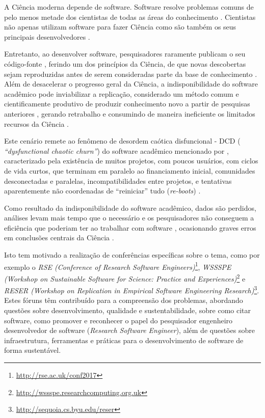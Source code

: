 \label{introducao}

A Ciência moderna depende de software. Software resolve problemas comuns de
pelo menos metade dos cientistas de todas as áreas do conhecimento
\cite{wilson2014best}. Cientistas não apenas utilizam software para fazer
Ciência como são também os seus principais desenvolvedores
\cite{goble2014better}.

Entretanto, ao desenvolver software, pesquisadores raramente publicam o seu
código-fonte \cite{robles2010replicating, amann2015software}, ferindo um dos
princípios da Ciência, de que novas descobertas sejam reproduzidas antes de
serem consideradas parte da base de conhecimento \cite{stodden2009enabling}.
%
Além de desacelerar o progresso geral da Ciência, a indisponibilidade do
software acadêmico pode inviabilizar a replicação, considerado um  método comum
e cientificamente produtivo de produzir conhecimento novo a partir de pesquisas
anteriores \cite{king1995replication, stodden2010reproducible}, gerando
retrabalho e consumindo de maneira ineficiente os limitados recursos da Ciência
\cite{howison2013incentives, katz2014transitive}.

Este cenário remete ao fenômeno de desordem caótica disfuncional - DCD ({\it
``dysfunctional chaotic churn''}) do software acadêmico mencionado por
, caracterizado pela existência de muitos
projetos, com poucos usuários, com ciclos de vida curtos, que terminam em
paralelo ao financiamento inicial, comunidades desconectadas e paralelas,
incompatibilidades entre projetos, e tentativas aparentemente não coordenadas
de ``reiniciar'' tudo ({\it re-boots}) \cite{howison2015understanding}.

Como resultado da indisponibilidade do software acadêmico, dados são perdidos,
análises levam mais tempo que o necessário e os pesquisadores não conseguem a
eficiência que poderiam ter ao trabalhar com software \cite{wilson2017good},
ocasionando graves erros em conclusões centrais da Ciência
\cite{merali2010computational}.

Isto tem motivado a realização de conferências específicas sobre o tema, como
por exemplo o {\it RSE (Conference of Research Software
Engineers)}\footnote{\url{http://rse.ac.uk/conf2017}}, {\it WSSSPE (Workshop on
Sustainable Software for Science: Practice and
Experiences)}\footnote{\url{http://wssspe.researchcomputing.org.uk}} e {\it
RESER (Workshop on Replication in Empirical Software Engineering
Research)}\footnote{\url{http://sequoia.cs.byu.edu/reser}}.  Estes fóruns têm
contribuído para a compreensão dos problemas, abordando questões sobre
desenvolvimento, qualidade e sustentabilidade, sobre como citar software, como
promover e reconhecer o papel do pesquisador engenheiro desenvolvedor de
software ({\it Research Software Engineer}), além de questões sobre
infraestrutura, ferramentas e práticas para o desenvolvimento de software de
forma sustentável.

